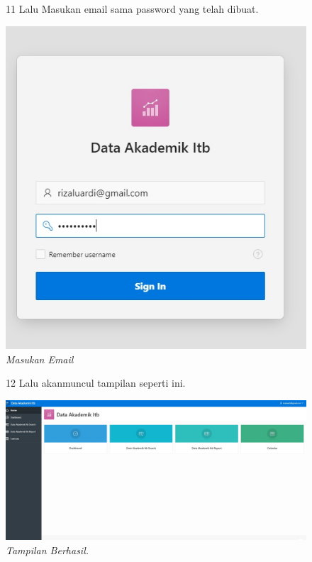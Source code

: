 \begin{enumerate}
\begin{figure}
\item[11] Lalu Masukan email sama password yang telah dibuat.

    \begin{center}
\includegraphics[scale=0.4]{figures/11.jpg}
    \caption{\textit{Masukan Email}}
        \end{center}
\label{gambar}
\end{figure}

\begin{figure}
\item[12] Lalu akanmuncul tampilan seperti ini.

    \begin{center}
\includegraphics[scale=0.2]{figures/12.jpg}
    \caption{\textit{Tampilan Berhasil.}}
        \end{center}
\label{gambar}
\end{figure}


\end{enumerate}
